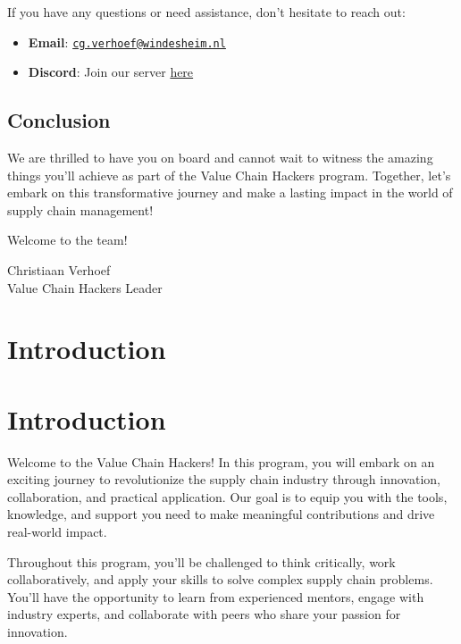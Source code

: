 \documentclass[
  letterpaper,
  DIV=11,
  numbers=noendperiod]{scrreprt}
\providecommand{\tightlist}{%
  \setlength{\itemsep}{0pt}\setlength{\parskip}{0pt}}\usepackage{longtable,booktabs,array}
\begin{document}
If you have any questions or need assistance, don't hesitate to reach
out:

\begin{itemize}
\tightlist
\item
  \textbf{Email}:
  \href{mailto:cg.verhoef@windesheim.nl}{\nolinkurl{cg.verhoef@windesheim.nl}}
\item
  \textbf{Discord}: Join our server
  \href{https://discord.gg/zzA7YSsY}{here}
\end{itemize}

\section{Conclusion}\label{conclusion}

We are thrilled to have you on board and cannot wait to witness the
amazing things you'll achieve as part of the Value Chain Hackers
program. Together, let's embark on this transformative journey and make
a lasting impact in the world of supply chain management!

Welcome to the team!

Christiaan Verhoef\\
Value Chain Hackers Leader


\chapter{Introduction}\label{introduction}


\chapter{Introduction}\label{introduction-1}

Welcome to the Value Chain Hackers! In this program, you will embark on
an exciting journey to revolutionize the supply chain industry through
innovation, collaboration, and practical application. Our goal is to
equip you with the tools, knowledge, and support you need to make
meaningful contributions and drive real-world impact.

Throughout this program, you'll be challenged to think critically, work
collaboratively, and apply your skills to solve complex supply chain
problems. You'll have the opportunity to learn from experienced mentors,
engage with industry experts, and collaborate with peers who share your
passion for innovation.
\end{document}
